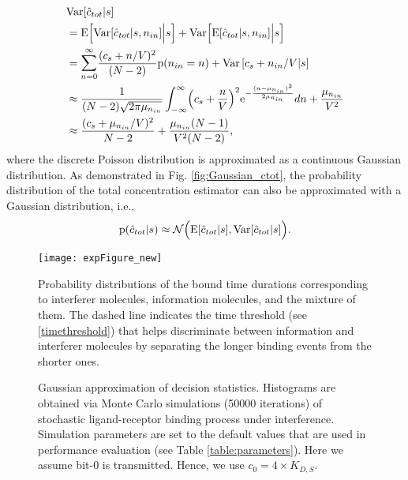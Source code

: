 \documentclass[twocolumn]{IEEEtran}
\newcommand{\p}{\mathrm{p}}
\newcommand{\E}{\mathrm{E}}
\newcommand{\e}{\mathrm{e}}
\newcommand{\Var}{\mathrm{Var}}
\begin{document}
\begin{align}
&\Var[\hat{c}_{tot}|s] \\ \nonumber
&= \E\Bigl[\Var[\hat{c}_{tot}|s, n_{in}]\Big|s \Bigr] + \Var\Bigl[\E[\hat{c}_{tot}|s, n_{in}]\Big|s \Bigr]  \\ \nonumber
&= \mathlarger{\sum}_{n=0}^\infty \frac{(c_s + n/V)^2}{ (N-2)} \p(n_{in} = n) + \Var\left[c_s + n_{in}/V |s\right] \\ \nonumber
& \approx \frac{1}{(N-2) \sqrt{2 \pi \mu_{n_{in}}}}  \int_{-\infty}^\infty \Bigl(c_s + \frac{n}{V}\Bigr)^2 \e^{ -\frac{(n-\mu_{n_{in}})^2}{2\mu_{n_{in}}}} dn + \frac{\mu_{n_{in}}}{V^2}\\ \nonumber
&\approx \frac{(c_s + \mu_{n_{in}}/V)^2} {N-2} + \frac{\mu_{n_{in}} (N-1)} {V^2 (N-2)},
\label{eq:numberofboundMeanAndVariance}
\end{align}
where the discrete Poisson distribution is approximated as a continuous Gaussian distribution. As demonstrated in Fig. \ref{fig:Gaussian_ctot}, the probability distribution of the total concentration estimator can also be approximated with a Gaussian distribution, i.e.,
\begin{equation}
\p(\hat{c}_{tot}|s) \approx \mathcal{N}\Bigl(\E[\hat{c}_{tot}|s] , \Var[\hat{c}_{tot}|s] \Bigr). \label{eq:DRUTpdf}
\end{equation}
\begin{figure}[!t]
	\centering
	\texttt{[image: expFigure\_new]}
	\caption{Probability distributions of the bound time durations corresponding to interferer molecules, information molecules, and the mixture of them. The dashed line indicates the time threshold (see \eqref{timethreshold}) that helps discriminate between information and interferer molecules by separating the longer binding events from the shorter ones. }
	\label{fig:mixture}
\end{figure}

\begin{figure*}[!t]
	\centering
	\caption{Gaussian approximation of decision statistics. Histograms are obtained via Monte Carlo simulations (50000 iterations) of stochastic ligand-receptor binding process under interference. Simulation parameters are set to the default values that are used in performance evaluation (see Table \ref{table:parameters}). Here we assume bit-0 is transmitted. Hence, we use $c_0 = 4 \times K_{D,S}$.  }
	\label{fig:Gaussian}
\end{figure*}
\end{document}
